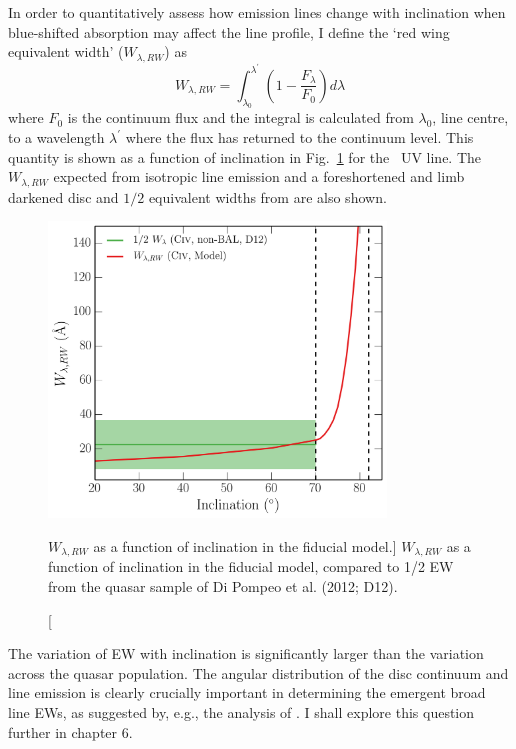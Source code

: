 In order to quantitatively assess how emission lines change with 
inclination when blue-shifted absorption 
may affect the line profile, I define the `red wing equivalent width' ($W_{\lambda,RW}$) as
\begin{equation}
W_{\lambda,RW} = \int_{\lambda_0}^{\lambda^\prime} \left( 1 - \frac{F_\lambda}{F_0} \right) d\lambda
\label{rwew}
\end{equation}
where $F_0$ is the continuum flux and the integral is calculated from $\lambda_0$, line centre,
to a wavelength $\lambda^\prime$ where the flux has returned to the continuum level.
This quantity is shown as a function of inclination in Fig.~\ref{fig:ew_in_model} for the \civ\ UV line.
The $W_{\lambda,RW}$ expected from isotropic line emission and a foreshortened 
and limb darkened disc and $1/2$ equivalent widths from 
\cite{dipompeo2012b} are also shown.

\begin{figure}
\centering
\includegraphics[width=0.8\textwidth]{figures/06-agnpaper/ew.png}
\caption
[$W_{\lambda,RW}$ as a function of inclination in the fiducial model.]
{
$W_{\lambda,RW}$ as a function of inclination in the fiducial model, compared
to 1/2 EW from the quasar sample of Di Pompeo et al. (2012; D12).
}
\label{fig:ew_in_model}
\end{figure}

The variation of EW with inclination is significantly 
larger than the variation across the quasar population.
The angular distribution of the disc 
continuum and line emission is clearly crucially important in 
determining the emergent broad line EWs, as suggested by, e.g., 
the analysis of \cite{risaliti2011}. 
I shall explore this question further in chapter 6.  

